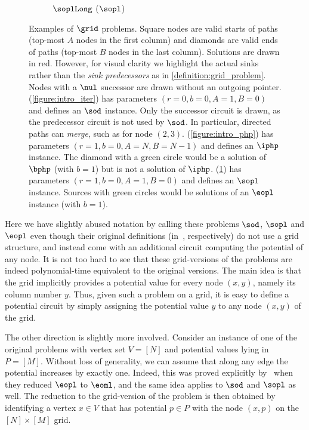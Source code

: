 \begin{figure}[t]
\begin{subfigure}[b]{0.33\textwidth}
    \vspace{2mm}
    \caption{$\soplLong$ ($\sopl$)}
    \label{figure:intro_sopl}
\end{subfigure}
\caption{Examples of $\grid$ problems. Square nodes are valid starts of paths (top-most $A$ nodes in the first column) and diamonds are valid ends of paths (top-most $B$ nodes in the last column). Solutions are drawn in red. However, for visual clarity we highlight the actual sinks rather than the \emph{sink predecessors} as in \cref{definition:grid_problem}. Nodes with a $\nul$ successor are drawn without an outgoing pointer.
(\ref{figure:intro_iter}) has parameters $(r = 0, b = 0, A=1, B=0)$ and defines an $\sod$ instance. Only the successor circuit is drawn, as the predecessor circuit is not used by $\sod$. In particular, directed paths can \emph{merge}, such as for node $(2, 3)$.
(\ref{figure:intro_php}) has parameters $(r=1, b=0, A=N, B=N-1)$ and defines an $\iphp$ instance. The diamond with a green circle would be a solution of $\bphp$ (with $b=1$) but is not a solution of $\iphp$.
(\ref{figure:intro_sopl}) has parameters $(r =1, b= 0, A=1, B=0)$ and defines an $\sopl$ instance. Sources with green circles would be solutions of an $\eopl$ instance (with $b=1$).
}
\label{figure:grid_problem_summary}
\end{figure}



\begin{remark}
Here we have slightly abused notation by calling these problems $\sod$, $\sopl$ and $\eopl$ even though their original definitions (in~\cite{Johnson1988,Goos2018,Fearnley2020}, respectively) do not use a grid structure, and instead come with an additional circuit computing the potential of any node. It is not too hard to see that these grid-versions of the problems are indeed polynomial-time equivalent to the original versions. The main idea is that the grid implicitly provides a potential value for every node $(x,y)$, namely its column number $y$. Thus, given such a problem on a grid, it is easy to define a potential circuit by simply assigning the potential value $y$ to any node $(x,y)$ of the grid.

The other direction is slightly more involved. Consider an instance of one of the original problems with vertex set $V = [N]$ and potential values lying in $P = [M]$. Without loss of generality, we can assume that along any edge the potential increases by exactly one. Indeed, this was proved explicitly by~\cite{Fearnley2020} when they reduced $\eopl$ to $\eoml$, and the same idea applies to $\sod$ and $\sopl$ as well. The reduction to the grid-version of the problem is then obtained by identifying a vertex $x \in V$ that has potential $p \in P$ with the node $(x,p)$ on the $[N] \times [M]$ grid.
\end{remark}


